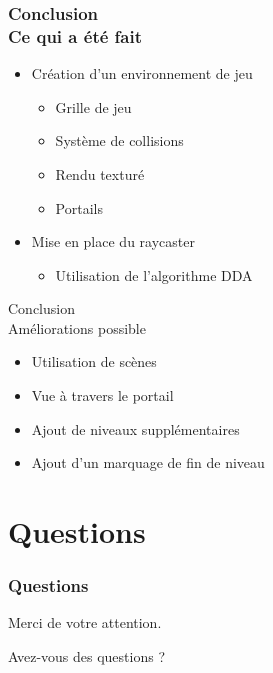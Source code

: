 \documentclass{beamer}
\begin{document}
\begin{frame}
    \frametitle{Conclusion \\
                \small Ce qui a été fait}
    \begin{block}{}
        \begin{itemize}
            \item Création d'un environnement de jeu
            \begin{itemize}
                \item Grille de jeu
                \item Système de collisions
                \item Rendu texturé
                \item Portails
            \end{itemize}
            \item Mise en place du raycaster
            \begin{itemize}
                \item Utilisation de l'algorithme DDA
            \end{itemize}
        \end{itemize}
    \end{block}
\end{frame}

\begin{frame}{Conclusion \\
                \small Améliorations possible}
    \begin{block}{}
        \begin{itemize}
            \item Utilisation de scènes
            \item Vue à travers le portail
            \item Ajout de niveaux supplémentaires
            \item Ajout d'un marquage de fin de niveau
        \end{itemize}
    \end{block}
\end{frame}

\section*{Questions}

\begin{frame}
    \frametitle{Questions}
    \begin{block}{}
        \centering
        Merci de votre attention.
        
        Avez-vous des questions ?
    \end{block}
\end{frame}
\end{document}
